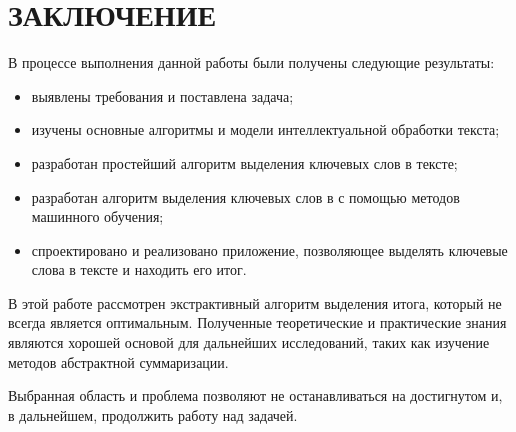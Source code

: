 \chapter*{ЗАКЛЮЧЕНИЕ}

В процессе выполнения данной работы были получены следующие результаты:

\begin{itemize}
    \item выявлены требования и поставлена задача;
    \item изучены основные алгоритмы и модели интеллектуальной обработки текста;
    \item разработан простейший алгоритм выделения ключевых слов в тексте;
    \item разработан алгоритм выделения ключевых слов в с помощью методов машинного обучения;
    \item спроектировано и реализовано приложение, позволяющее выделять ключевые слова в тексте и находить его итог.
\end{itemize}

В этой работе рассмотрен экстрактивный алгоритм выделения итога, который не всегда является оптимальным. Полученные теоретические и практические знания являются хорошей основой для дальнейших исследований, таких как изучение методов абстрактной суммаризации.

Выбранная область и проблема позволяют не останавливаться на достигнутом и, в дальнейшем, продолжить работу над задачей.
\newpage
